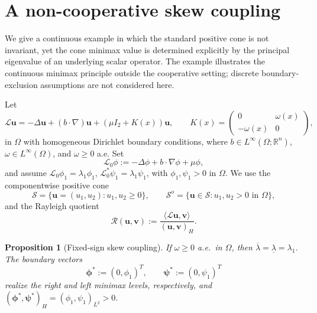 \documentclass[preprint,10pt]{elsarticle}
\theoremstyle{plain}
\newtheorem{proposition}{Proposition}
\theoremstyle{definition}
\theoremstyle{remark}
\begin{document}

\section{A non-cooperative skew coupling}
\label{sec:exampl}

We give a continuous example in which the standard positive cone is not
invariant, yet the cone minimax value is determined explicitly by the
principal eigenvalue of an underlying scalar operator. The example
illustrates the continuous minimax principle outside the cooperative
setting; discrete boundary-exclusion assumptions are not considered here.

Let
\[
\mathcal L\mathbf u
=
-\Delta\mathbf u+(b\cdot\nabla)\mathbf u
+(\mu I_2+K(x))\mathbf u,
\qquad
K(x)=\begin{pmatrix}0&\omega(x)\\-\omega(x)&0\end{pmatrix},
\]
in $\Omega$ with homogeneous Dirichlet boundary conditions, where
$b\in L^\infty(\Omega;\mathbb R^n)$, $\omega\in L^\infty(\Omega)$, and
$\omega\ge0$ a.e. Set
\[
\mathcal L_0\phi:=-\Delta\phi+b\cdot\nabla\phi+\mu\phi,
\]
and assume $\mathcal L_0\phi_1=\lambda_1\phi_1$,
$\mathcal L_0^*\psi_1=\lambda_1\psi_1$, with $\phi_1,\psi_1>0$ in $\Omega$.
We use the componentwise positive cone
\[
\mathcal S=\{\mathbf u=(u_1,u_2):u_1,u_2\ge0\},
\qquad
\mathcal S^o=\{\mathbf u\in\mathcal S:u_1,u_2>0\text{ in }\Omega\},
\]
and the Rayleigh quotient
\[
\mathcal R(\mathbf u,\mathbf v)
:=
\frac{\langle\mathcal L\mathbf u,\mathbf v\rangle}{(\mathbf u,\mathbf v)_H}.
\]

\begin{proposition}[Fixed-sign skew coupling]
	\label{prop:skew-drift-fixed-sign}
	If $\omega\ge0$ a.e.\ in $\Omega$, then
	$\overline\lambda=\underline\lambda=\lambda_1$. The boundary vectors
	\[
	\boldsymbol\phi^*:=(0,\phi_1)^T, \qquad
	\boldsymbol\psi^*:=(0,\psi_1)^T
	\]
	realize the right and left minimax levels, respectively, and
	$(\boldsymbol\phi^*,\boldsymbol\psi^*)_H=(\phi_1,\psi_1)_{L^2}>0$.
\end{proposition}
\end{document}
